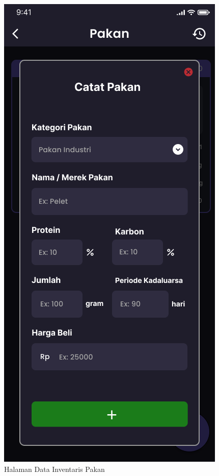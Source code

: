 \begin{spacing}{1.5}
\begin{figure}[H]
			\caption{Halaman Data Inventaris Pakan}
		\endminipage\hfill
			\includegraphics[width=\linewidth]{gambar/sprint1/mockup_input_feed.png}

\end{figure}
\end{spacing}
